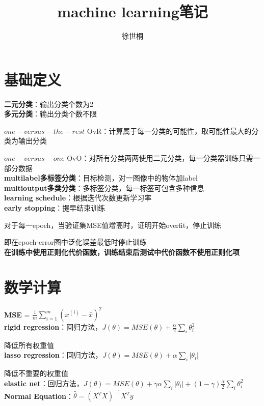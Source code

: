 \documentclass[UTF8]{ctexart}
\title{machine learning笔记}
\author{徐世桐}
\date{}
\begin{document}
\maketitle

\section{基础定义}
\noindent \textbf{二元分类}：输出分类个数为2\\
\textbf{多元分类}：输出分类个数不限

  $one-versus-the-rest$ OvR：计算属于每一分类的可能性，取可能性最大的分类为输出分类

  $one-versus-one$ OvO：对所有分类两两使用二元分类，每一分类器训练只需一部分数据\\
\textbf{multilabel多标签分类}：目标检测，对一图像中的物体加label\\
\textbf{multioutput多类分类}：多标签分类，每一标签可包含多种信息\\
\textbf{learning schedule}：根据迭代次数更新学习率\\
\textbf{early stopping}：提早结束训练

  对于每一epoch，当验证集MSE值增高时，证明开始overfit，停止训练

  即在epoch-error图中泛化误差最低时停止训练\\
\textbf{在训练中使用正则化代价函数，训练结束后测试中代价函数不使用正则化项}

\section{数学计算}
\noindent \textbf{MSE} = $\frac{1}{m}\sum_{i=1}^{m}(x^{(i)} - \bar{x} )^2$\\
\textbf{rigid regression}：回归方法，$J(\theta) = MSE(\theta) + \frac{\alpha}{2}\sum_{i}\theta_i^2$

  降低所有权重值\\
\textbf{lasso regression}：回归方法，$J(\theta) = MSE(\theta) + \alpha \sum_i |\theta_i|$

  降低不重要的权重值\\
\textbf{elastic net}：回归方法，$J(\theta) = MSE(\theta) + \gamma\alpha \sum_i |\theta_i| + (1-\gamma)\frac{\alpha}{2}\sum_{i}\theta_i^2$\\
\textbf{Normal Equation}：$\hat{\theta} = (X^TX)^{-1}X^Ty$
\end{document}
